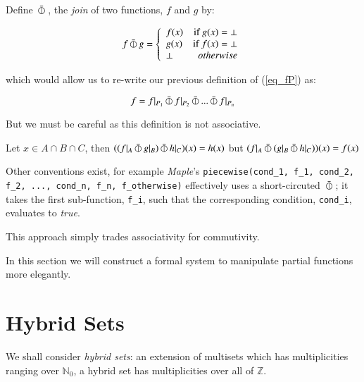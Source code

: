 \begin{definition}
Define $\,\bar{\varobar}\,$, the \emph{join} of two functions, $f$ and $g$ by:

\begin{equation}
\label{def:fjoin}
f \,\bar{\varobar}\, g =  
  \left\{
     \begin{array}{lr}
       f(x) & \text{if } g(x) = \bot \\
       g(x) & \text{if } f(x) = \bot \\
       \bot & otherwise
     \end{array}
   \right.
\end{equation}
\end{definition}

which would allow us to re-write our previous definition of (\ref{eq_fP}) as:

\begin{equation}
f = f|_{P_1} \,\bar{\varobar}\, f|_{P_2} \,\bar{\varobar}\, ... \,\bar{\varobar}\, f|_{P_n}
\end{equation}


But we must be careful as this definition is not associative.

Let $x \in A \cap B \cap C$, then $( (f|_{A} \,\bar{\varobar}\, g|_{B} ) \,\bar{\varobar}\, h|_{C} )(x) = h(x)$ but $( f|_{A} \,\bar{\varobar}\, ( g|_{B} \,\bar{\varobar}\, h|_{C} ))(x) = f(x)$

Other conventions exist, for example \emph{Maple}'s 
\texttt{piecewise(cond\_1, f\_1, cond\_2, f\_2, ..., cond\_n, f\_n, f\_otherwise)} 
effectively uses a short-circuted $\,\bar{\varobar}\,$;
it takes the first sub-function, \texttt{f\_i}, such that the corresponding condition, \texttt{cond\_i}, evaluates to \emph{true}.

This approach simply trades associativity for commutivity.

In this section we will construct a formal system to manipulate partial functions more elegantly.










\section{Hybrid Sets}


We shall consider \emph{hybrid sets}: an extension of multisets which has multiplicities ranging over $\mathbb{N}_0$, a hybrid set has multiplicities over all of $\mathbb{Z}$.

